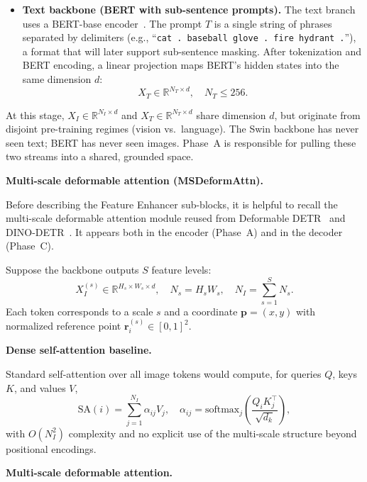 \begin{enrichment}
\begin{enrichment}[Method][subsection]
\begin{itemize}
			\item \textbf{Text backbone (BERT with sub-sentence prompts).}  
			The text branch uses a BERT-base encoder~\cite{devlin2019_bert}. The prompt \(T\) is a single string of phrases separated by delimiters (e.g., ``\texttt{cat . baseball glove . fire hydrant .}''), a format that will later support sub-sentence masking. After tokenization and BERT encoding, a linear projection maps BERT’s hidden states into the same dimension \(d\):
			\[
			X_T \in \mathbb{R}^{N_T \times d}, \quad N_T \leq 256.
			\]
		\end{itemize}
		
		At this stage, \(X_I \in \mathbb{R}^{N_I \times d}\) and \(X_T \in \mathbb{R}^{N_T \times d}\) share dimension \(d\), but originate from disjoint pre-training regimes (vision vs.\ language). The Swin backbone has never seen text; BERT has never seen images. Phase~A is responsible for pulling these two streams into a shared, grounded space.
		
		\medskip
		
		\noindent\textbf{Multi-scale deformable attention (MSDeformAttn).}
		\label{enr:chapter14_groundingdino_deformable_attention}
		
		Before describing the Feature Enhancer sub-blocks, it is helpful to recall the multi-scale deformable attention module reused from Deformable DETR~\cite{zhu2021_deformabledetr} and DINO-DETR~\cite{zhang2022_dino}. It appears both in the encoder (Phase~A) and in the decoder (Phase~C).
		
		Suppose the backbone outputs \(S\) feature levels:
		\[
		X_I^{(s)} \in \mathbb{R}^{H_s \times W_s \times d}, \quad N_s = H_s W_s, \quad N_I = \sum_{s=1}^{S} N_s.
		\]
		Each token corresponds to a scale \(s\) and a coordinate \(\mathbf{p} = (x,y)\) with normalized reference point \(\mathbf{r}_i^{(s)} \in [0,1]^2\).
		
		\medskip
		
		\noindent\textbf{Dense self-attention baseline.}
		
		Standard self-attention over all image tokens would compute, for queries \(Q\), keys \(K\), and values \(V\),
		\[
		\mathrm{SA}(i) = \sum_{j=1}^{N_I} \alpha_{ij} V_j, \quad
		\alpha_{ij} = \text{softmax}_j\left(\frac{Q_i K_j^\top}{\sqrt{d_k}}\right),
		\]
		with \(O(N_I^2)\) complexity and no explicit use of the multi-scale structure beyond positional encodings.
		
		\medskip
		
		\noindent\textbf{Multi-scale deformable attention.}
		

\end{enrichment}
\end{enrichment}
